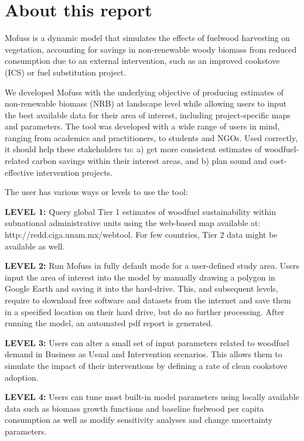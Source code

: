 \documentclass[english,a4paper,11pt,twoside]{report}
\def\chaptername{Chapter}
\begin{document}
 	

\tableofcontents
\renewcommand{\chaptername}{}  %
\newpage
	
\chapter{About this report} \label{ch:Intro}
Mofuss is a dynamic model that simulates the effects of fuelwood harvesting on vegetation, accounting for savings in non-renewable woody biomass from reduced consumption due to an external intervention, such as an improved cookstove (ICS) or fuel substitution project.

We developed Mofuss with the underlying objective of producing estimates of non-renewable biomass (NRB) at landscape level while allowing users to input the best available data for their area of interest, including project-specific maps and parameters. The tool was developed with a wide range of users in mind, ranging from academics and practitioners, to students and NGOs. Used correctly, it should help these stakeholders to: a) get more consistent estimates of woodfuel-related carbon savings within their interest areas, and b) plan sound and cost-effective intervention projects.

The user has various ways or levels to use the tool:

\textbf{LEVEL 1:} Query global Tier 1 estimates of woodfuel sustainability within subnational administrative units using the web-based map available at: http://redd.ciga.unam.mx/webtool.  For few countries, Tier 2 data might be available as well.

\textbf{LEVEL 2:} Run Mofuss in fully default mode for a user-defined study area. Users input the area of interest into the model by manually drawing a polygon in Google Earth and saving it into the hard-drive. This, and subsequent levels, require to download free software and datasets from the internet and save them in a specified location on their hard drive, but do no further processing. After running the model, an automated pdf report is generated.

\textbf{LEVEL 3:} Users can alter a small set of input parameters related to woodfuel demand in Business as Usual and Intervention scenarios. This allows them to simulate the impact of their interventions by defining a rate of clean cookstove adoption.

\textbf{LEVEL 4:} Users can tune most built-in model parameters using locally available data such as biomass growth functions and baseline fuelwood per capita consumption as well as modify sensitivity analyses and change uncertainty parameters.
\end{document}
